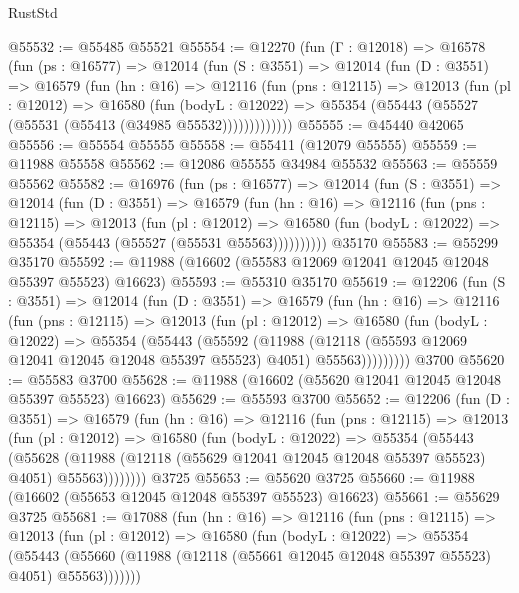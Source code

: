 \begin{lexlean}{RustStd}
\begin{coremodule}
@55532 := @55485 @55521
@55554 := @12270
    (fun (Γ : @12018) =>
    @16578
      (fun (ps : @16577) =>
      @12014
        (fun (S : @3551) =>
        @12014
          (fun (D : @3551) =>
          @16579
            (fun (hn : @16) =>
            @12116
              (fun (pns : @12115) =>
              @12013
                (fun (pl : @12012) =>
                @16580
                  (fun (bodyL : @12022) =>
                  @55354 (@55443 (@55527 (@55531 (@55413 (@34985 @55532)))))))))))))
@55555 := @45440 @42065
@55556 := @55554 @55555
@55558 := @55411 (@12079 @55555)
@55559 := @11988 @55558
@55562 := @12086 @55555 @34984 @55532
@55563 := @55559 @55562
@55582 := @16976
    (fun (ps : @16577) =>
    @12014
      (fun (S : @3551) =>
      @12014
        (fun (D : @3551) =>
        @16579
          (fun (hn : @16) =>
          @12116
            (fun (pns : @12115) =>
            @12013
              (fun (pl : @12012) =>
              @16580 (fun (bodyL : @12022) => @55354 (@55443 (@55527 (@55531 @55563))))))))))
    @35170
@55583 := @55299 @35170
@55592 := @11988 (@16602 (@55583 @12069 @12041 @12045 @12048 @55397 @55523) @16623)
@55593 := @55310 @35170
@55619 := @12206
    (fun (S : @3551) =>
    @12014
      (fun (D : @3551) =>
      @16579
        (fun (hn : @16) =>
        @12116
          (fun (pns : @12115) =>
          @12013
            (fun (pl : @12012) =>
            @16580
              (fun (bodyL : @12022) =>
              @55354
                (@55443
                  (@55592
                    (@11988
                      (@12118 (@55593 @12069 @12041 @12045 @12048 @55397 @55523) @4051)
                      @55563)))))))))
    @3700
@55620 := @55583 @3700
@55628 := @11988 (@16602 (@55620 @12041 @12045 @12048 @55397 @55523) @16623)
@55629 := @55593 @3700
@55652 := @12206
    (fun (D : @3551) =>
    @16579
      (fun (hn : @16) =>
      @12116
        (fun (pns : @12115) =>
        @12013
          (fun (pl : @12012) =>
          @16580
            (fun (bodyL : @12022) =>
            @55354
              (@55443
                (@55628
                  (@11988 (@12118 (@55629 @12041 @12045 @12048 @55397 @55523) @4051) @55563))))))))
    @3725
@55653 := @55620 @3725
@55660 := @11988 (@16602 (@55653 @12045 @12048 @55397 @55523) @16623)
@55661 := @55629 @3725
@55681 := @17088
    (fun (hn : @16) =>
    @12116
      (fun (pns : @12115) =>
      @12013
        (fun (pl : @12012) =>
        @16580
          (fun (bodyL : @12022) =>
          @55354
            (@55443
              (@55660 (@11988 (@12118 (@55661 @12045 @12048 @55397 @55523) @4051) @55563)))))))

\end{coremodule}
\end{lexlean}
